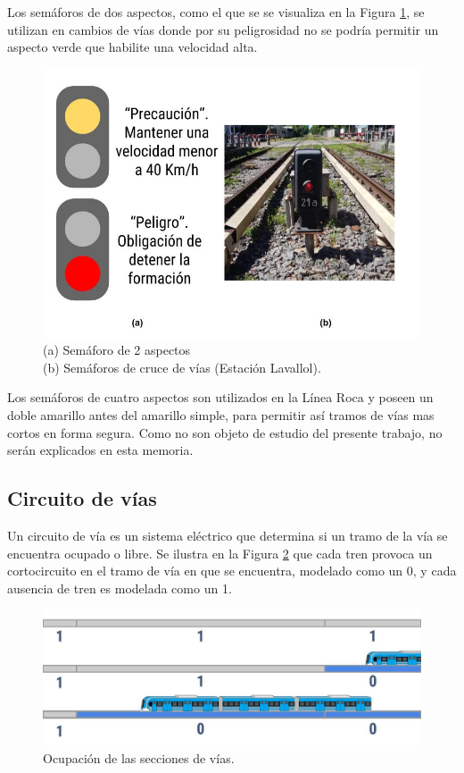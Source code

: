 			
			Los semáforos de dos aspectos, como el que se se visualiza en la Figura \ref{fig:Sem_2Aspectos}, se utilizan en cambios de vías donde por su peligrosidad no se podría permitir un aspecto verde que habilite una velocidad alta. 		
			 
			 \begin{figure}[htbp!]
				\centering
				\includegraphics[scale=.35]{./Figures/Sem2}
				\caption{(a) Semáforo de 2 aspectos\\(b) Semáforos de cruce de vías (Estación Lavallol).}
				\label{fig:Sem_2Aspectos}
			\end{figure}				
			
			Los semáforos de cuatro aspectos son utilizados en la Línea Roca y poseen un doble amarillo antes del amarillo simple, para permitir así tramos de vías mas cortos en forma segura. Como no son objeto de estudio del presente trabajo, no serán explicados en esta memoria.
		
		\subsection{Circuito de vías}
			Un circuito de vía es un sistema eléctrico que determina si un tramo de la vía se encuentra ocupado o libre. Se ilustra en la Figura \ref{fig:Ocupacion} que cada tren provoca un cortocircuito en el tramo de vía en que se encuentra, modelado como un 0, y cada ausencia de tren es modelada como un 1.
			
			\begin{figure}[h]
				\centering
				\includegraphics[scale=.4]{./Figures/Ocupacion}
				\caption{Ocupación de las secciones de vías.}
				\label{fig:Ocupacion}
			\end{figure}
			
